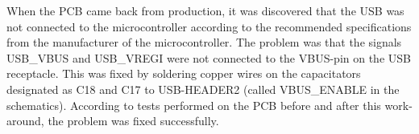 When the PCB came back from production, it was discovered that the USB was not connected to the microcontroller
according to the recommended specifications from the manufacturer of the microcontroller. 
The problem was that the signals USB\_VBUS and USB\_VREGI were not connected to the VBUS-pin on the USB receptacle. This was fixed by soldering copper wires on the capacitators designated as C18 and C17 to USB-HEADER2 (called VBUS\_ENABLE in the schematics).
According to tests performed on the PCB before and after this work-around, the problem was fixed successfully.
